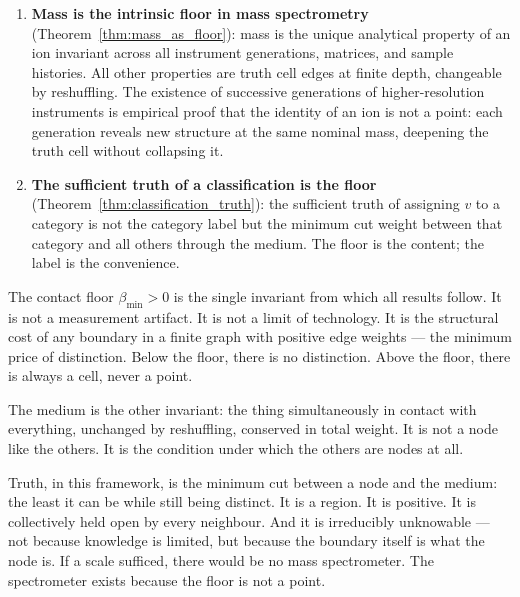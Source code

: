 \documentclass[11pt,twocolumn,a4paper]{article}
\theoremstyle{plain}
\theoremstyle{definition}
\theoremstyle{remark}
\newcommand{\bmin}{\beta_{\min}}
\begin{document}
\begin{enumerate}
\item \textbf{Mass is the intrinsic floor in mass spectrometry}
  (Theorem~\ref{thm:mass_as_floor}): mass is the unique analytical property
  of an ion invariant across all instrument generations, matrices, and sample
  histories. All other properties are truth cell edges at finite depth,
  changeable by reshuffling. The existence of successive generations of
  higher-resolution instruments is empirical proof that the identity of an
  ion is not a point: each generation reveals new structure at the same
  nominal mass, deepening the truth cell without collapsing it.

\item \textbf{The sufficient truth of a classification is the floor}
  (Theorem~\ref{thm:classification_truth}): the sufficient truth of
  assigning $v$ to a category is not the category label but the minimum
  cut weight between that category and all others through the medium.
  The floor is the content; the label is the convenience.
\end{enumerate}

The contact floor $\bmin > 0$ is the single invariant from which all
results follow. It is not a measurement artifact. It is not a limit of
technology. It is the structural cost of any boundary in a finite graph
with positive edge weights --- the minimum price of distinction. Below the
floor, there is no distinction. Above the floor, there is always a cell,
never a point.

The medium is the other invariant: the thing simultaneously in contact with
everything, unchanged by reshuffling, conserved in total weight. It is not
a node like the others. It is the condition under which the others are nodes
at all.

Truth, in this framework, is the minimum cut between a node and the medium:
the least it can be while still being distinct. It is a region. It is positive.
It is collectively held open by every neighbour. And it is irreducibly
unknowable --- not because knowledge is limited, but because the boundary
itself is what the node is. If a scale sufficed, there would be no mass
spectrometer. The spectrometer exists because the floor is not a point.



\end{document}
